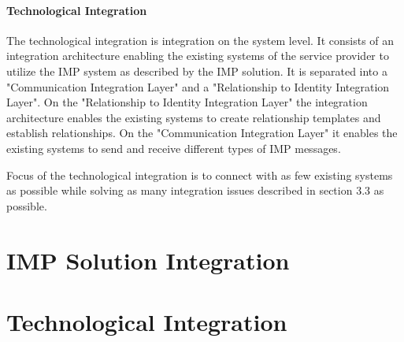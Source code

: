 \paragraph{Technological Integration} 
The technological integration is integration on the system level. It consists of an integration architecture enabling the existing systems of the service provider to utilize the IMP system as described by the IMP solution. It is separated into a "Communication Integration Layer" and a "Relationship to Identity Integration Layer". On the "Relationship to Identity Integration Layer" the integration architecture enables the existing systems to create relationship templates and establish relationships. On the "Communication Integration Layer" it enables the existing systems to send and receive different types of IMP messages.

Focus of the technological integration is to connect with as few existing systems as possible while solving as many integration issues described in section 3.3 as possible.

\section{IMP Solution Integration}



\section{Technological Integration}

